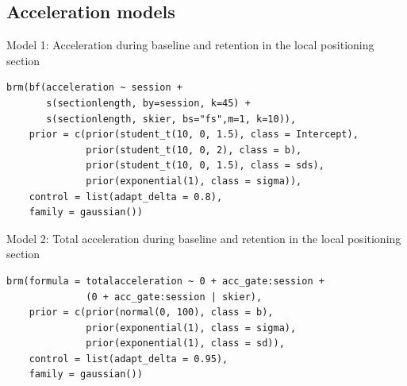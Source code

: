 \documentclass{article}
\begin{document}
\subsection{Acceleration models}


Model 1: Acceleration during baseline and retention in the local positioning section

\begin{verbatim}
brm(bf(acceleration ~ session + 
       s(sectionlength, by=session, k=45) +
       s(sectionlength, skier, bs="fs",m=1, k=10)), 
    prior = c(prior(student_t(10, 0, 1.5), class = Intercept),
              prior(student_t(10, 0, 2), class = b),
              prior(student_t(10, 0, 1.5), class = sds),
              prior(exponential(1), class = sigma)),
    control = list(adapt_delta = 0.8),
    family = gaussian())
\end{verbatim}

Model 2: Total acceleration during baseline and retention in the local positioning section

\begin{verbatim}
brm(formula = totalacceleration ~ 0 + acc_gate:session +
              (0 + acc_gate:session | skier),
    prior = c(prior(normal(0, 100), class = b),
              prior(exponential(1), class = sigma), 
              prior(exponential(1), class = sd)),
    control = list(adapt_delta = 0.95),
    family = gaussian())
\end{verbatim}





\printbibliography %
\end{document}
